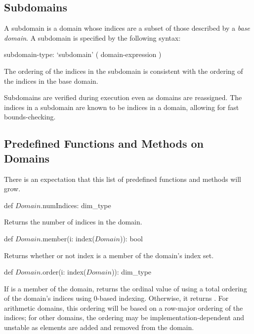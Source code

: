 \subsection{Subdomains}
\label{Subdomains}

A subdomain is a domain whose indices are a subset of those described
by a \emph{base domain}.  A subdomain is specified by the following
syntax:
\begin{syntax}
subdomain-type:
  `subdomain' ( domain-expression )
\end{syntax}
The ordering of the indices in the subdomain is consistent with the
ordering of the indices in the base domain.

Subdomains are verified during execution even as domains are
reassigned.  The indices in a subdomain are known to be indices in a
domain, allowing for fast bounds-checking.

\subsection{Predefined Functions and Methods on Domains}

There is an expectation that this list of predefined functions and
methods will grow.

\begin{protohead}
def $Domain$.numIndices: dim_type
\end{protohead}
\begin{protobody}
Returns the number of indices in the domain.
\end{protobody}

\begin{protohead}
def $Domain$.member(i: index($Domain$)): bool
\end{protohead}
\begin{protobody}
Returns whether or not index  is a member of the domain's
index set.
\end{protobody}

\begin{protohead}
def $Domain$.order(i: index($Domain$)): dim_type
\end{protohead}
\begin{protobody}
If  is a member of the domain, returns the ordinal value of
 using a total ordering of the domain's indices using 0-based
indexing.  Otherwise, it returns .  For arithmetic
domains, this ordering will be based on a row-major ordering of the
indices; for other domains, the ordering may be
implementation-dependent and unstable as elements are added and
removed from the domain.
\end{protobody}


